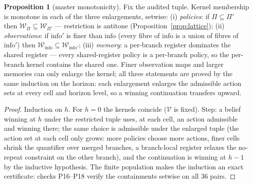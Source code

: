 \documentclass[10pt,twocolumn]{article}
\theoremstyle{definition}
\newtheorem{proposition}{Proposition}
\begin{document}
\begin{proposition}[master monotonicity]\label{prop:master}
Fix the audited tuple. Kernel membership is monotone in each of the
three enlargements, setwise: (i) \emph{policies}: if
\(\Pi \subseteq \Pi'\) then
\(\mathcal{W}_{\Pi} \subseteq \mathcal{W}_{\Pi'}\) --- restriction is
antitone (Proposition~\ref{prop:lattice}); (ii) \emph{observations}:
if \(\mathrm{info}'\) is finer than \(\mathrm{info}\) (every fibre of
\(\mathrm{info}\) is a union of fibres of \(\mathrm{info}'\)) then
\(\mathcal{W}_{\mathrm{info}} \subseteq
\mathcal{W}_{\mathrm{info}'}\); (iii) \emph{memory}: a per-branch
register dominates the shared register --- every shared-register policy
is a per-branch policy, so the per-branch kernel contains the shared
one. Finer observation maps and larger memories can only enlarge the
kernel; all three statements are proved by the same induction on the
horizon: each enlargement enlarges the admissible action sets at every
cell and horizon level, so a winning continuation transfers upward.
\end{proposition}

\begin{proof}
Induction on \(h\). For \(h = 0\) the kernels coincide
(\(\mathcal{V}\) is fixed). Step: a belief winning at \(h\) under the
restricted tuple uses, at each cell, an action admissible and winning
there; the same choice is admissible under the enlarged tuple (the
action set at each cell only grows: more policies choose more actions,
finer cells shrink the quantifier over merged branches, a branch-local
register relaxes the no-repeat constraint on the other branch), and the
continuation is winning at \(h-1\) by the inductive hypothesis. The
finite population makes the induction an exact certificate: checks
P16--P18 verify the containments setwise on all \(36\) pairs.
\end{proof}
\end{document}
